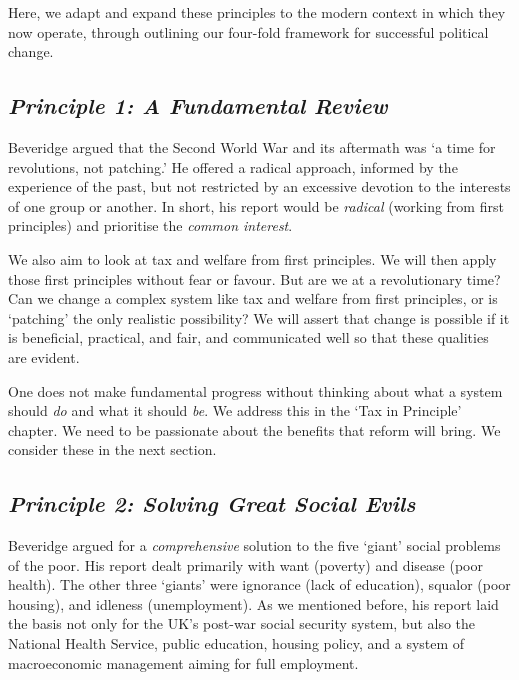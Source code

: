 \documentclass[]{tufte-handout}
\begin{document}
Here, we adapt and expand these principles to the modern context in
which they now operate, through outlining our four-fold framework for
successful political change.

\hypertarget{principle-1-a-fundamental-review}{%
\subsection{\texorpdfstring{\emph{Principle 1: A Fundamental
Review}}{Principle 1: A Fundamental Review}}\label{principle-1-a-fundamental-review}}

Beveridge argued that the Second World War and its aftermath was `a time
for revolutions, not patching.' He offered a radical approach, informed
by the experience of the past, but not restricted by an excessive
devotion to the interests of one group or another. In short, his report
would be \emph{radical} (working from first principles) and prioritise
the \emph{common interest}.

We also aim to look at tax and welfare from first principles. We will
then apply those first principles without fear or favour. But are we at
a revolutionary time? Can we change a complex system like tax and
welfare from first principles, or is `patching' the only realistic
possibility? We will assert that change is possible if it is beneficial,
practical, and fair, and communicated well so that these qualities are
evident.

One does not make fundamental progress without thinking about what a
system should \emph{do} and what it should \emph{be}. We address this in
the `Tax in Principle' chapter. We need to be passionate about the
benefits that reform will bring. We consider these in the next section.

\hypertarget{principle-2-solving-great-social-evils}{%
\subsection{\texorpdfstring{\emph{Principle 2: Solving Great Social
Evils}}{Principle 2: Solving Great Social Evils}}\label{principle-2-solving-great-social-evils}}

Beveridge argued for a \emph{comprehensive} solution to the five `giant'
social problems of the poor. His report dealt primarily with want
(poverty) and disease (poor health). The other three `giants' were
ignorance (lack of education), squalor (poor housing), and idleness
(unemployment). As we mentioned before, his report laid the basis not
only for the UK's post-war social security system, but also the National
Health Service, public education, housing policy, and a system of
macroeconomic management aiming for full employment.
\end{document}
